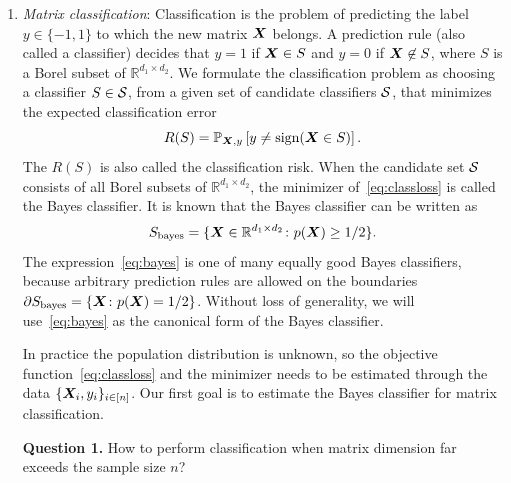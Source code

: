 \documentclass[11pt]{article}
\theoremstyle{plain}
\theoremstyle{definition}
\def\sign{\textup{sign}}
\def\bayesS{S_{\textup{bayes}}}
\begin{document}
\begin{enumerate}[label={2.\arabic*},wide, labelwidth=!, labelindent=0pt]
\item {\it Matrix classification}: Classification is the problem of predicting the label $y\in \{-1,1\}$ to which the new matrix $\bm X$ belongs. A prediction rule (also called a classifier) decides that $y=1$ if $\bm X\in S$ and $y=0$ if $\bm X \not\in S$, where $S$ is a Borel subset of $\mathbb{R}^{d_1\times d_2}$. We formulate the classification problem as choosing a classifier $S\in \mathcal{S}$, from a given set of candidate classifiers $\mathcal{S}$, that minimizes the expected classification error 
\begin{equation}\label{eq:classloss}
R(S)=\mathbb{P}_{\mX,y}\left[y\neq \sign(\mX\in S)\right].
\end{equation}
The $R(S)$ is also called the classification risk. When the candidate set $\mathcal{S}$ consists of all Borel subsets of $\mathbb{R}^{d_1\times d_2}$, the minimizer of~\eqref{eq:classloss} is called the Bayes classifier. It is known that the Bayes classifier can be written as 
\begin{equation}\label{eq:bayes}
\bayesS=\{\mX\in\mathbb{R}^{d_1\times d_2}\colon p(\mX)\geq 1/2\}.
\end{equation}
The expression~\eqref{eq:bayes} is one of many equally good Bayes classifiers, because arbitrary prediction rules are allowed on the boundaries $\partial S_{\text{bayes}} = \{\bm X\colon p(\bm X)=1/2\}$. Without loss of generality, we will use~\eqref{eq:bayes} as the canonical form of the Bayes classifier. 


In practice the population distribution is unknown, so the objective function~\eqref{eq:classloss} and the minimizer needs to be estimated through the data $\{\bm X_i,y_i\}_{i\in[n]}$. Our first goal is to estimate the Bayes classifier for matrix classification. 

{\bf Question 1.} How to perform classification when matrix dimension far exceeds the sample size $n$?


\end{enumerate}
\end{document}

